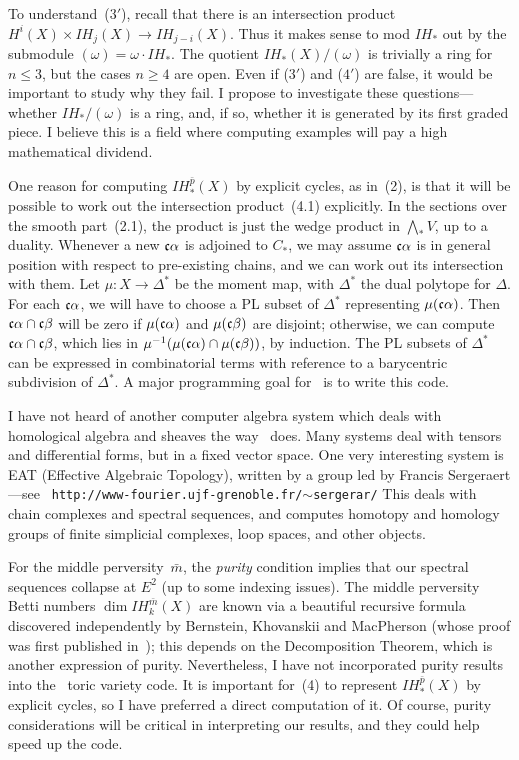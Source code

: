 To understand~($3'$), recall that there is an intersection product
$H^i(X) \times IH_j(X) \to IH_{j-i}(X)$.  Thus it makes sense to mod
$IH_*$ out by the submodule $(\omega) = \omega\cdot IH_*$.  The
quotient $IH_*(X)/(\omega)$ is trivially a ring for $n\le 3$, but the
cases $n\ge 4$ are open.  Even if ($3'$) and ($4'$) are false, it
would be important to study why they fail.  I propose to investigate
these questions---whether $IH_*/(\omega)$ is a ring, and, if so,
whether it is generated by its first graded piece.  I believe this is
a field where computing examples will pay a high mathematical
dividend.

One reason for computing $IH^{\bar p}_*(X)$ by explicit cycles, as
in~(2), is that it will be possible to work out the intersection
product~(4.1) explicitly.  In the sections over the smooth
part~(2.1), the product is just the wedge product in
$\bigwedge\nolimits_* V$, up to a duality.  Whenever a new $\frak c
\alpha$ is adjoined to $C_*$, we may assume $\frak c \alpha$ is in
general position with respect to pre-existing chains, and we can work
out its intersection with them.  Let $\mu : X \to \Delta^*$ be the
moment map, with $\Delta^*$ the dual polytope for $\Delta$.  For each
$\frak c \alpha$, we will have to choose a PL subset of $\Delta^*$
representing $\mu(\frak c \alpha)$.  Then $\frak c \alpha \cap \frak c
\beta$ will be zero if $\mu(\frak c \alpha)$ and $\mu(\frak c \beta)$
are disjoint; otherwise, we can compute $\frak c \alpha \cap \frak c
\beta$, which lies in $\mu^{-1}(\mu(\frak c \alpha) \cap \mu(\frak c
\beta))$, by induction.  The PL subsets of $\Delta^*$ can be expressed
in combinatorial terms with reference to a barycentric subdivision of
$\Delta^*$.  A major programming goal for \shh\ is to write this code.

 I have not heard of another
computer algebra system which deals with homological algebra and
sheaves the way \shh\ does.  Many systems deal with tensors and
differential forms, but in a fixed vector space.  One very interesting
system is EAT (Effective Algebraic Topology), written by a group led
by Francis Sergeraert---see {\tt
http://www-fourier.ujf-grenoble.fr/${\sim}$sergerar/} \quad This deals with
chain complexes and spectral sequences, and computes homotopy and
homology groups of finite simplicial complexes, loop spaces, and other
objects.

For the middle perversity~$\bar m$, the {\sl purity\/} condition
implies that our spectral sequences collapse at $E^2$ (up to some
indexing issues).  The middle perversity Betti numbers $\dim IH^{\bar
m}_k(X)$ are known via a beautiful recursive formula discovered
independently by Bernstein, Khovanskii and MacPherson (whose proof was
first published in~\cite{F}); this depends on the Decomposition
Theorem, which is another expression of purity.  Nevertheless, I have
not incorporated purity results into the \shh\ toric variety code.  It
is important for~(4) to represent $IH^{\bar p}_*(X)$ by explicit
cycles, so I have preferred a direct computation of it.  Of course,
purity considerations will be critical in interpreting our results,
and they could help speed up the code.

